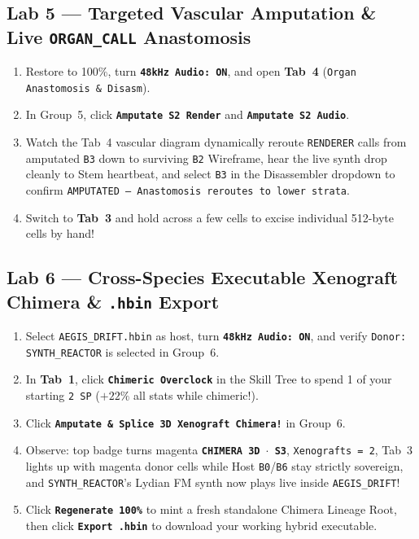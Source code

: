 \documentclass[10pt,letterpaper]{article}
\newcommand{\kbd}[1]{%
  \tikz[baseline=(char.base)]{%
    \node[draw=plnSlate!60, fill=plnSoft, rounded corners=2pt, inner xsep=3.2pt, inner ysep=1.2pt, font=\scriptsize\ttfamily\bfseries] (char) {#1};%
  }%
}
\begin{document}
\subsection{Lab 5 --- Targeted Vascular Amputation \& Live \texttt{ORGAN\_CALL} Anastomosis}
\begin{enumerate}[leftmargin=1.6em, itemsep=1.5pt]
  \item Restore to 100\%, turn \textbf{\texttt{48kHz Audio: ON}}, and open \textbf{Tab~4} (\texttt{Organ Anastomosis \& Disasm}).
  \item In Group~5, click \textbf{\texttt{Amputate S2 Render}} and \textbf{\texttt{Amputate S2 Audio}}.
  \item Watch the Tab~4 vascular diagram dynamically reroute \texttt{RENDERER} calls from amputated \texttt{B3} down to surviving \texttt{B2} Wireframe, hear the live synth drop cleanly to Stem heartbeat, and select \texttt{B3} in the Disassembler dropdown to confirm \texttt{AMPUTATED --- Anastomosis reroutes to lower strata}.
  \item Switch to \textbf{Tab~3} and hold \kbd{Shift+Drag} across a few cells to excise individual 512-byte cells by hand!
\end{enumerate}

\subsection{Lab 6 --- Cross-Species Executable Xenograft Chimera \& \texttt{.hbin} Export}
\begin{enumerate}[leftmargin=1.6em, itemsep=1.5pt]
  \item Select \texttt{AEGIS\_DRIFT.hbin} as host, turn \textbf{\texttt{48kHz Audio: ON}}, and verify \texttt{Donor: SYNTH\_REACTOR} is selected in Group~6.
  \item In \textbf{Tab~1}, click \textbf{\texttt{Chimeric Overclock}} in the Skill Tree to spend 1 of your starting \texttt{2 SP} ($+22\%$ all stats while chimeric!).
  \item Click \textbf{\texttt{Amputate \& Splice 3D Xenograft Chimera!}} in Group~6.
  \item Observe: top badge turns magenta \textbf{\texttt{CHIMERA 3D $\cdot$ S3}}, \texttt{Xenografts = 2}, Tab~3 lights up with magenta donor cells while Host \texttt{B0}/\texttt{B6} stay strictly sovereign, and \texttt{SYNTH\_REACTOR}'s Lydian FM synth now plays live inside \texttt{AEGIS\_DRIFT}!
  \item Click \textbf{\texttt{Regenerate 100\%}} to mint a fresh standalone Chimera Lineage Root, then click \textbf{\texttt{Export .hbin}} to download your working hybrid executable.
\end{enumerate}
\end{document}
